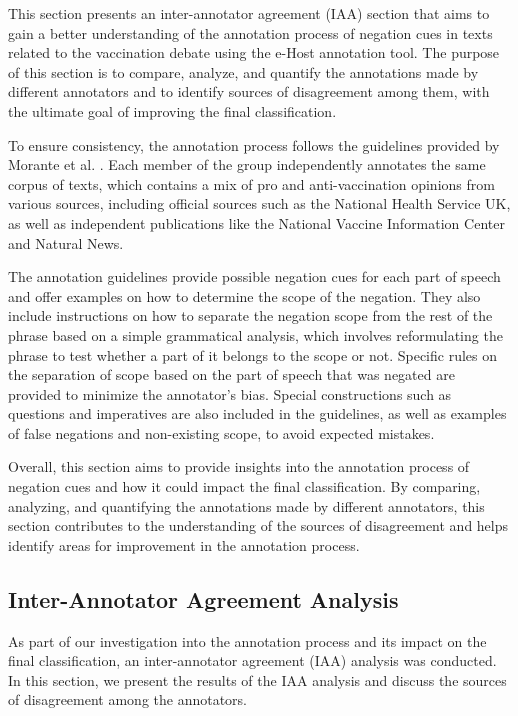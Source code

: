 This section presents an inter-annotator agreement (IAA) section that aims to gain a better understanding of the annotation process of negation cues in texts related to the vaccination debate using the e-Host annotation tool. The purpose of this section is to compare, analyze, and quantify the annotations made by different annotators and to identify sources of disagreement among them, with the ultimate goal of improving the final classification.

To ensure consistency, the annotation process follows the guidelines provided by Morante et al. \cite{morante2011annotation}. Each member of the group independently annotates the same corpus of texts, which contains a mix of pro and anti-vaccination opinions from various sources, including official sources such as the National Health Service UK, as well as independent publications like the National Vaccine Information Center and Natural News.

The annotation guidelines provide possible negation cues for each part of speech and offer examples on how to determine the scope of the negation. They also include instructions on how to separate the negation scope from the rest of the phrase based on a simple grammatical analysis, which involves reformulating the phrase to test whether a part of it belongs to the scope or not. Specific rules on the separation of scope based on the part of speech that was negated are provided to minimize the annotator's bias. Special constructions such as questions and imperatives are also included in the guidelines, as well as examples of false negations and non-existing scope, to avoid expected mistakes.

Overall, this section aims to provide insights into the annotation process of negation cues and how it could impact the final classification. By comparing, analyzing, and quantifying the annotations made by different annotators, this section contributes to the understanding of the sources of disagreement and helps identify areas for improvement in the annotation process.

\subsection{Inter-Annotator Agreement Analysis}
As part of our investigation into the annotation process and its impact on the final classification, an inter-annotator agreement (IAA) analysis was conducted. In this section, we present the results of the IAA analysis and discuss the sources of disagreement among the annotators.

